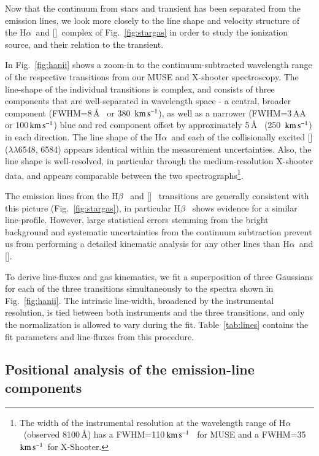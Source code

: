 \documentclass[traditabstract]{aa}
\newcommand{\kms}{$\rm{km\,s^{-1}}$}
\newcommand{\hb}{H$\beta$}
\newcommand{\ha}{H$\alpha$}
\newcommand{\oiii}{[\ion{O}{iii}]}
\newcommand{\nii}{[\ion{N}{ii}]}
\begin{document}
Now that the continuum from stars and transient has been separated from the emission lines, we look more closely to the line shape and velocity structure of the \ha\, and \nii\, complex of Fig.~\ref{fig:stargas} in order to study the ionization source, and their relation to the transient.

In Fig.~\ref{fig:hanii} shows a zoom-in to the continuum-subtracted wavelength range of the respective transitions from our MUSE and X-shooter spectroscopy. The line-shape of the individual transitions is complex, and consists of three components that are well-separated in wavelength space - a central, broader component (FWHM=8\,\AA~ or 380~\kms), as well as a narrower (FWHM=3\,AA~ or 100\,\kms) blue and red component offset by approximately 5\,\AA~ (250~\kms) in each direction. The line shape of the \ha\, and each of the collisionally excited \nii($\lambda\lambda$6548, 6584) appears identical within the measurement uncertainties. Also, the line shape is well-resolved, in particular through the medium-resolution X-shooter data, and appears comparable between the two spectrographs\footnote{The width of the instrumental resolution at the wavelength range of \ha~(observed 8100\,\AA) has a FWHM=110\,\kms~ for MUSE and a FWHM=35\,\kms~for X-Shooter.}.

The emission lines from the \hb~ and \oiii~ transitions are generally consistent with this picture (Fig.~\ref{fig:stargas}), in particular \hb~ shows evidence for a similar line-profile. However, large statistical errors stemming from the bright background and systematic uncertainties from the continuum subtraction prevent us from performing a detailed kinematic analysis for any other lines than \ha~and \nii.

To derive line-fluxes and gas kinematics, we fit a superposition of three Gaussians for each of the three transitions simultaneously to the spectra shown in Fig.~\ref{fig:hanii}. The intrinsic line-width, broadened by the instrumental resolution, is tied between both instruments and the three transitions, and only the normalization is allowed to vary during the fit. Table~\ref{tab:lines} contains the fit parameters and line-fluxes from this procedure.

\subsection{Positional analysis of the emission-line components}
\end{document}
